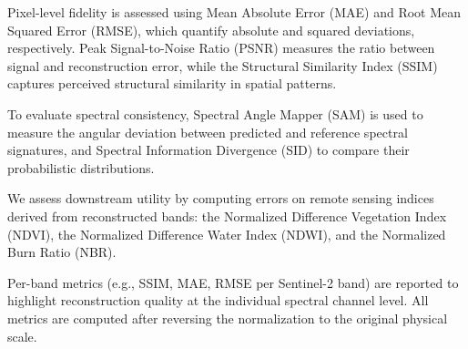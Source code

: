 Pixel-level fidelity is assessed using Mean Absolute Error (MAE) and Root Mean Squared Error (RMSE), which quantify absolute and squared deviations, respectively. Peak Signal-to-Noise Ratio (PSNR) measures the ratio between signal and reconstruction error, while the Structural Similarity Index (SSIM) captures perceived structural similarity in spatial patterns. 

To evaluate spectral consistency, Spectral Angle Mapper (SAM) is used to measure the angular deviation between predicted and reference spectral signatures, and Spectral Information Divergence (SID) to compare their probabilistic distributions. 

We assess downstream utility by computing errors on remote sensing indices derived from reconstructed bands: the Normalized Difference Vegetation Index (NDVI), the Normalized Difference Water Index (NDWI), and the Normalized Burn Ratio (NBR). 

Per-band metrics (e.g., SSIM, MAE, RMSE per Sentinel-2 band) are reported to highlight reconstruction quality at the individual spectral channel level. All metrics are computed after reversing the normalization to the original physical scale.

